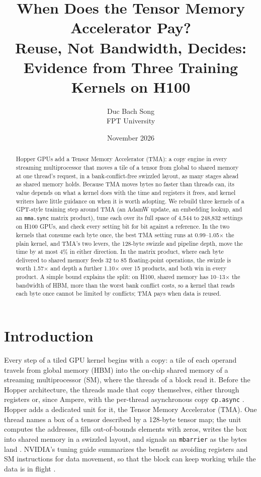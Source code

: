 \documentclass[10pt]{article}
\title{When Does the Tensor Memory Accelerator Pay?\\
\large Reuse, Not Bandwidth, Decides: Evidence from Three Training Kernels on {H100}}
\author{Duc Bach Song\\
FPT University}
\date{November 2026}
\newcommand{\x}{\ensuremath{\times}}
\begin{document}
\maketitle

\begin{abstract}
Hopper GPUs add a Tensor Memory Accelerator (TMA): a copy engine in every streaming multiprocessor that moves a tile of a
tensor from global to shared memory at one thread's request, in a bank-conflict-free swizzled layout, as many stages ahead
as shared memory holds. Because TMA moves bytes no faster than threads can, its value depends on what a kernel does with
the time and registers it frees, and kernel writers have little guidance on when it is worth adopting. We rebuild three
kernels of a GPT-style training step around TMA (an AdamW update, an embedding lookup, and an \texttt{mma.sync} matrix
product), tune each over its full space of 4{,}544 to 248{,}832 settings on H100 GPUs, and check every setting bit for bit
against a reference. In the two kernels that consume each byte once, the best TMA setting runs at 0.99--1.05\x{} the plain
kernel, and TMA's two levers, the 128-byte swizzle and pipeline depth, move the time by at most 4\% in either direction.
In the matrix product, where each byte delivered to shared memory feeds 32 to 85 floating-point operations, the swizzle is
worth 1.57\x{} and depth a further 1.10\x{} over 15 products, and both win in every product. A simple bound explains the
split: on H100, shared memory has 10--13\x{} the bandwidth of HBM, more than the worst bank conflict costs, so a kernel that
reads each byte once cannot be limited by conflicts; TMA pays when data is reused.
\end{abstract}

\section{Introduction}

Every step of a tiled GPU kernel begins with a copy: a tile of each operand travels from global memory (HBM) into the
on-chip shared memory of a streaming multiprocessor (SM), where the threads of a block read it. Before the Hopper
architecture, the threads made that copy themselves, either through registers or, since Ampere, with the per-thread
asynchronous copy \texttt{cp.async} \citep{andersch2022hopper}. Hopper adds a dedicated unit for it, the Tensor Memory
Accelerator (TMA). One thread names a box of a tensor described by a 128-byte tensor map; the unit computes the
addresses, fills out-of-bounds elements with zeros, writes the box into shared memory in a swizzled layout, and signals
an \texttt{mbarrier} as the bytes land \citep{nvidia2022h100, nvidia2024ptx}. NVIDIA's tuning guide summarizes the
benefit as avoiding registers and SM instructions for data movement, so that the block can keep working while the data is
in flight \citep{nvidia2026hoppertuning}.
\end{document}
